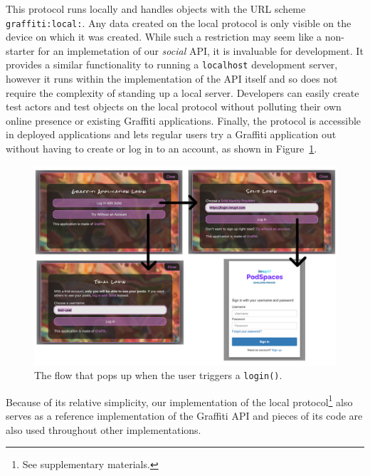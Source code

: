 This protocol runs locally
and handles objects with the URL scheme \texttt{graffiti:local:}.
Any data created on the local protocol is only visible on the device on which
it was created.
While such a restriction may seem like a non-starter for an implemetation
of our \emph{social} API, it is invaluable for development.
It provides a similar functionality to running a \texttt{localhost} development server,
however it runs within the implementation of the API itself and so
does not require the complexity of standing up a local server.
Developers can easily create test actors and test objects on the local protocol
without polluting their own online presence or existing Graffiti applications.
Finally, the protocol is accessible in deployed applications
and lets regular users try a Graffiti application out without
having to create or log in to an account, as shown in
Figure~\ref{above-and-below:figure:login}.

\begin{figure}[h]
    \includegraphics[width=\textwidth]{figures/login.png}
    \caption{The flow that pops up when the user triggers a \texttt{login()}.}
    \label{above-and-below:figure:login}
\end{figure}

Because of its relative simplicity, our implementation of the local protocol\footnote{
    See supplementary materials.
} also serves
as a reference implementation of the Graffiti API and pieces of its code are also used
throughout other implementations.



